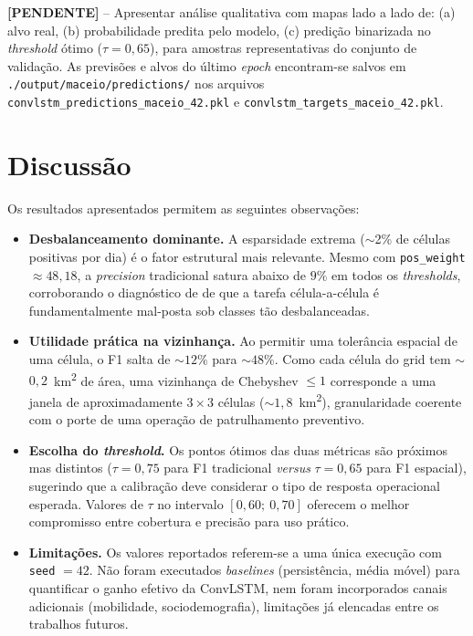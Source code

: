 \textbf{[PENDENTE]} -- Apresentar análise qualitativa com mapas lado a lado de: (a) alvo real, (b) probabilidade predita pelo modelo, (c) predição binarizada no \textit{threshold} ótimo ($\tau = 0{,}65$), para amostras representativas do conjunto de validação. As previsões e alvos do último \textit{epoch} encontram-se salvos em \texttt{./output/maceio/predictions/} nos arquivos \texttt{convlstm\_predictions\_maceio\_42.pkl} e \texttt{convlstm\_targets\_maceio\_42.pkl}.

\section{Discussão}
\label{Sec:Discussao}

Os resultados apresentados permitem as seguintes observações:

\begin{itemize}
  \item \textbf{Desbalanceamento dominante.} A esparsidade extrema ($\sim$2\% de células positivas por dia) é o fator estrutural mais relevante. Mesmo com \texttt{pos\_weight} $\approx 48{,}18$, a \textit{precision} tradicional satura abaixo de $9\%$ em todos os \textit{thresholds}, corroborando o diagnóstico de  de que a tarefa célula-a-célula é fundamentalmente mal-posta sob classes tão desbalanceadas.
  \item \textbf{Utilidade prática na vizinhança.} Ao permitir uma tolerância espacial de uma célula, o F1 salta de $\sim$$12\%$ para $\sim$$48\%$. Como cada célula do grid tem $\sim$$0{,}2$~km\textsuperscript{2} de área, uma vizinhança de Chebyshev $\leq 1$ corresponde a uma janela de aproximadamente $3 \times 3$ células ($\sim$$1{,}8$~km\textsuperscript{2}), granularidade coerente com o porte de uma operação de patrulhamento preventivo.
  \item \textbf{Escolha do \textit{threshold}.} Os pontos ótimos das duas métricas são próximos mas distintos ($\tau = 0{,}75$ para F1 tradicional \textit{versus} $\tau = 0{,}65$ para F1 espacial), sugerindo que a calibração deve considerar o tipo de resposta operacional esperada. Valores de $\tau$ no intervalo $[0{,}60;\ 0{,}70]$ oferecem o melhor compromisso entre cobertura e precisão para uso prático.
  \item \textbf{Limitações.} Os valores reportados referem-se a uma única execução com \texttt{seed} $= 42$. Não foram executados \textit{baselines} (persistência, média móvel) para quantificar o ganho efetivo da ConvLSTM, nem foram incorporados canais adicionais (mobilidade, sociodemografia), limitações já elencadas entre os trabalhos futuros.
\end{itemize}